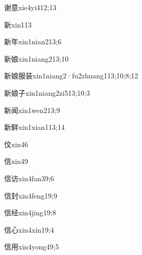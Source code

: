 \begin{verbete}{谢意}{xie4yi4}{12;13}
\end{verbete}
\begin{verbete}{新}{xin1}{13}
\end{verbete}
\begin{verbete}{新年}{xin1nian2}{13;6}
\end{verbete}
\begin{verbete}{新娘}{xin1niang2}{13;10}
\end{verbete}
\begin{verbete}{新娘服装}{xin1niang2·fu2zhuang1}{13;10;8;12}
\end{verbete}
\begin{verbete}{新娘子}{xin1niang2zi5}{13;10;3}
\end{verbete}
\begin{verbete}{新闻}{xin1wen2}{13;9}
\end{verbete}
\begin{verbete}{新鲜}{xin1xian1}{13;14}
\end{verbete}
\begin{verbete}{伩}{xin4}{6}
\end{verbete}
\begin{verbete}{信}{xin4}{9}
\end{verbete}
\begin{verbete}{信访}{xin4fan3}{9;6}
\end{verbete}
\begin{verbete}{信封}{xin4feng1}{9;9}
\end{verbete}
\begin{verbete}{信经}{xin4jing1}{9;8}
\end{verbete}
\begin{verbete}{信心}{xin4xin1}{9;4}
\end{verbete}
\begin{verbete}{信用}{xin4yong4}{9;5}
\end{verbete}
